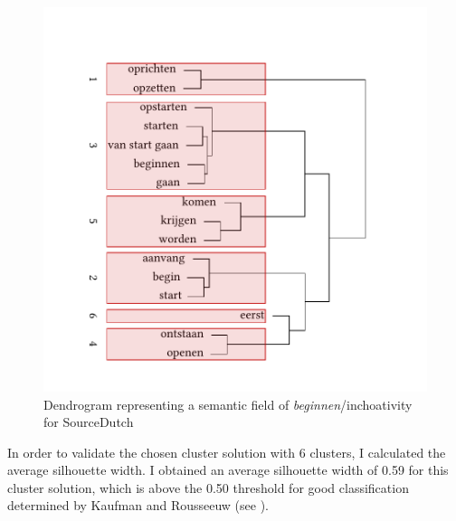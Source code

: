 \begin{figure}  
\includegraphics[width=\textwidth]{figures/tree52.pdf}
\caption{\label{fig:4:52}  Dendrogram representing a semantic field of \textit{beginnen}/inchoativity for SourceDutch}
\end{figure}

In order to validate the chosen cluster solution with 6 clusters, I calculated the average silhouette width. I obtained an average silhouette width of 0.59 for this cluster solution, which is above the 0.50 threshold for good classification determined by Kaufman and Rousseeuw (see ).


